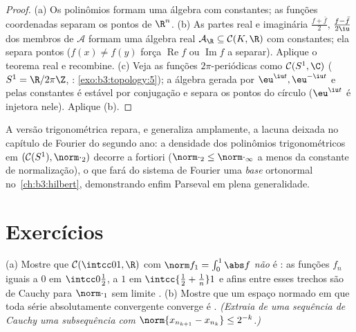 \begin{proof}
(a) Os polinômios formam uma álgebra com constantes; as funções
coordenadas separam os pontos de $\R^n$.
(b) As partes real e imaginária $\frac{f + \bar f}2$, $\frac{f - \bar f}{2\iu}$ dos membros de $\mathcal A$ formam
uma álgebra real $\mathcal A_\R \subseteq \mathcal C(K, \R)$ com constantes; ela separa pontos ($f(x) \ne f(y)$ força
$\operatorname{Re}f$ ou $\operatorname{Im}f$ a separar). Aplique o teorema real e recombine.
(c) Veja as funções $2\pi$-periódicas como $\mathcal C(S^1, \C)$ ($S^1 = \R/2\pi\Z$, :
\cref{exo:b3:topology:5}); a álgebra gerada por $\eu^{\iu t}, \eu^{-\iu t}$ e pelas constantes é estável
por conjugação e separa os pontos do círculo ($\eu^{\iu t}$ é injetora nele).
Aplique (b).
\end{proof}

\begin{remark}\label{rem:b3:complete:swremark}
A versão trigonométrica repara, e generaliza amplamente, a lacuna
deixada no capítulo de Fourier do segundo ano: a densidade dos
polinômios trigonométricos em $(\mathcal C(S^1), \norm\cdot_2)$ decorre a fortiori ($\norm\cdot_2 \leq \norm\cdot_\infty$ a menos da
constante de normalização), o que fará do sistema de Fourier uma
\emph{base} ortonormal no~\cref{ch:b3:hilbert}, demonstrando enfim Parseval em
plena generalidade.
\end{remark}

\section{Exercícios}

\begin{exercise}[$\star$]\label{exo:b3:complete:1}
(a) Mostre que $\mathcal C(\intcc01, \R)$ com $\norm f_1 = \int_0^1\abs f$ \emph{não} é : as funções
$f_n$ iguais a $0$ em $\intcc0{\frac12}$, a $1$ em $\intcc{\frac12 + \frac1n}1$ e afins entre
esses trechos são de Cauchy para $\norm\cdot_1$ sem limite .
(b) Mostre que um espaço normado em que toda série absolutamente
convergente converge é . \emph{(Extraia de uma sequência de
Cauchy uma subsequência com $\norm{x_{n_{k+1}} -
x_{n_k}} \leq 2^{-k}$.)}
\end{exercise}

